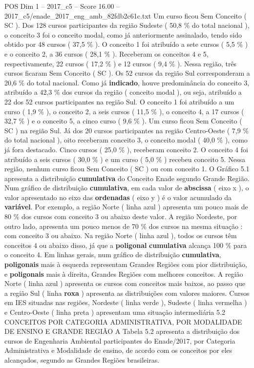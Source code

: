 \begin{textsample}{POS Dim 1 – 2017\_c5 – Score 16.00 – 2017\_c5/enade\_2017\_eng\_amb\_82fdb2c61c.txt}
Um curso ficou Sem Conceito ( SC ).
Dos 128 cursos participantes da região Sudeste ( 50,8 \% do total nacional ), o conceito 3 foi o conceito modal, como já anteriormente assinalado, tendo sido obtido por 48 cursos ( 37,5 \% ).
O conceito 1 foi atribuído a sete cursos ( 5,5 \% ) e o conceito 2, a 36 cursos ( 28,1 \% ).
Receberam os conceitos 4 e 5, respectivamente, 22 cursos ( 17,2 \% ) e 12 cursos ( 9,4 \% ).
Nessa região, três cursos ficaram Sem Conceito ( SC ).
Os 52 cursos da região Sul corresponderam a 20,6 \% do total nacional.
Como já \textbf{indicado}, houve predominância do conceito 3, atribuído a 42,3 \% dos cursos da região ( conceito modal ), ou seja, atribuído a 22 dos 52 cursos participantes na região Sul.
O conceito 1 foi atribuído a um curso ( 1,9 \% ), o conceito 2, a seis cursos ( 11,5 \% ), o conceito 4, a 17 cursos ( 32,7 \% ) e o conceito 5, a cinco curso ( 9,6 \% ).
Um curso ficou Sem Conceito ( SC ) na região Sul.
Já dos 20 cursos participantes na região Centro-Oeste ( 7,9 \% do total nacional ), oito receberam conceito 3, o conceito modal ( 40,0 \% ), como já fora destacado.
Cinco cursos ( 25,0 \% ), receberam conceito 2.
O conceito 4 foi atribuído a seis cursos ( 30,0 \% ) e um curso ( 5,0 \% ) recebeu conceito 5.
Nessa região, nenhum curso ficou Sem Conceito ( SC ) ou com conceito 1.
O Gráfico 5.1 apresenta a distribuição \textbf{cumulativa} do Conceito Enade segundo Grande Região.
Num gráfico de distribuição \textbf{cumulativa}, em cada valor de \textbf{abscissa} ( eixo x ), o valor apresentado no eixo das \textbf{ordenadas} ( eixo y ) é o valor acumulado da \textbf{variável}.
Por exemplo, a região Norte ( linha azul ) apresenta um pouco mais de 80 \% dos cursos com conceito 3 ou abaixo deste valor.
A região Nordeste, por outro lado, apresenta um pouco menos de 70 \% dos cursos na mesma situação : com conceito 3 ou abaixo.
Na região Norte ( linha azul ), todos os cursos têm conceitos 4 ou abaixo disso, já que a \textbf{poligonal} \textbf{cumulativa} alcança 100 \% para o conceito 4.
Em linhas gerais, num gráfico de distribuição \textbf{cumulativa}, \textbf{poligonais} mais à esquerda representam Grandes Regiões com pior distribuição, e \textbf{poligonais} mais à direita, Grandes Regiões com melhores conceitos.
A região Norte ( linha azul ) apresenta os cursos com conceitos mais baixos, ao passo que a região Sul ( linha \textbf{roxa} ) apresenta as distribuições com valores maiores.
Cursos em IES situadas nas regiões, Nordeste ( linha verde ), Sudeste ( linha vermelha ) e Centro-Oeste ( linha preta ) apresentam uma situação intermediária 5.2 CONCEITOS POR CATEGORIA ADMINISTRATIVA, POR MODALIDADE DE ENSINO E GRANDE REGIÃO A Tabela 5.2 apresenta a distribuição dos cursos de Engenharia Ambiental participantes do Enade/2017, por Categoria Administrativa e Modalidade de ensino, de acordo com os conceitos por eles alcançados, segundo as Grandes Regiões brasileiras.

\end{textsample}
